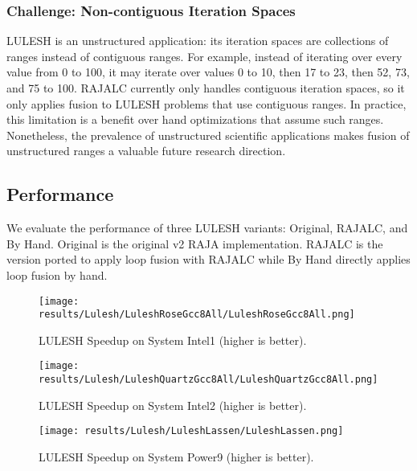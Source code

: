 \subsubsection{Challenge: Non-contiguous Iteration Spaces}

LULESH is an unstructured application: its iteration spaces are collections
of ranges instead of contiguous ranges. 
For example, instead of iterating over every value from 0 to 100, it may
iterate over values 0 to 10, then 17 to 23, then 52, 73, and 75 to 100.
RAJALC currently only handles contiguous iteration spaces, so it only
applies fusion to LULESH problems that use contiguous ranges.
In practice, this limitation is a benefit over hand optimizations that assume
such ranges.
Nonetheless, the prevalence of unstructured scientific applications makes
fusion of unstructured ranges a valuable future research direction.

\subsection{Performance}

We evaluate the performance of three LULESH variants: Original, RAJALC, and
By Hand.
Original is the original v2 RAJA implementation.
RAJALC is the version ported to apply loop fusion with RAJALC while By Hand
directly applies loop fusion by hand.

\begin{figure}[t]
\texttt{[image: results/Lulesh/LuleshRoseGcc8All/LuleshRoseGcc8All.png]}

\caption{LULESH Speedup on System Intel1 (higher is better).}
\label{LULESHRose}
\end{figure}

\begin{figure}[t]
\texttt{[image: results/Lulesh/LuleshQuartzGcc8All/LuleshQuartzGcc8All.png]}
\caption{LULESH Speedup on System Intel2 (higher is better).}
\label{LULESHQuartz}
\end{figure}

\begin{figure}[t]
\texttt{[image: results/Lulesh/LuleshLassen/LuleshLassen.png]}
\caption{LULESH Speedup on System Power9 (higher is better).}
\label{LULESHLassen}
\end{figure}


